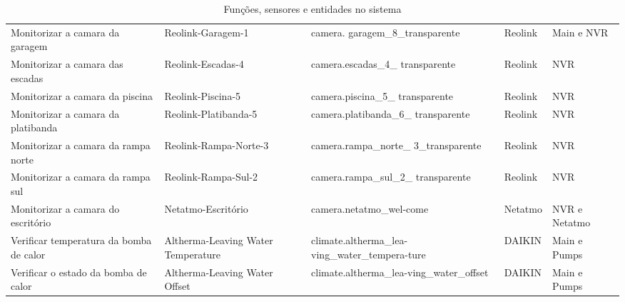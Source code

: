 \begin{table}[h!]
{\begin{tabularx}{\textwidth}{|X|p{2.5cm}|>{\raggedright\arraybackslash}X|p{2.1cm}|p{2.1cm}|}
Monitorizar a camara da garagem & Reolink-Garagem-1 & camera. garagem\_8\_transparente & Reolink & Main e NVR \\

Monitorizar a camara das escadas & Reolink-Escadas-4 & camera.escadas\_4\_ transparente & Reolink & NVR \\

Monitorizar a camara da piscina & Reolink-Piscina-5 & camera.piscina\_5\_ transparente & Reolink & NVR \\

Monitorizar a camara da platibanda & Reolink-Platibanda-5 & camera.platibanda\_6\_ transparente & Reolink & NVR \\

Monitorizar a camara da rampa norte & Reolink-Rampa-Norte-3 & camera.rampa\_norte\_ 3\_transparente & Reolink & NVR \\

Monitorizar a camara da rampa sul & Reolink-Rampa-Sul-2 & camera.rampa\_sul\_2\_ transparente & Reolink & NVR \\

Monitorizar a camara do escritório & Netatmo-Escritório & camera.netatmo\_wel-come & Netatmo & NVR e Netatmo \\

Verificar temperatura da bomba de calor & Altherma-Leaving Water Temperature & climate.altherma\_lea-ving\_water\_tempera-ture & DAIKIN & Main e Pumps \\

Verificar o estado da bomba de calor & Altherma-Leaving Water Offset & climate.altherma\_lea-ving\_water\_offset & DAIKIN & Main e Pumps \\


\hline
\end{tabularx}
}
\caption{Funções, sensores e entidades no sistema}
\end{table}